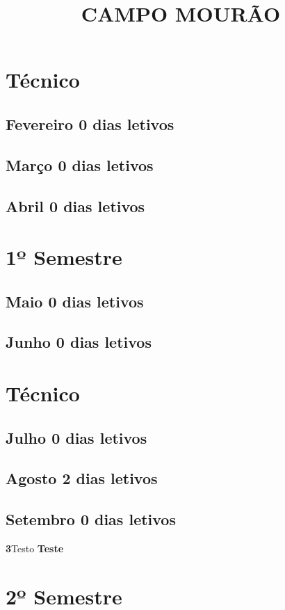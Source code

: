 \documentclass[thesis]{hmcposter}
\author{ }
\title{CAMPO MOURÃO}
\begin{document}
\begin{poster}
			\section{\color{hmcorange}Técnico}\subsection{Fevereiro \hfill 0 dias letivos}\subsection{Março \hfill 0 dias letivos}\subsection{Abril \hfill 0 dias letivos}\vfill\null
\columnbreak
\section{\hfill \color{hmcorange}1º Semestre}
\subsection{Maio \hfill 0 dias letivos}\subsection{Junho \hfill 0 dias letivos}\newpage
\section{\color{hmcorange}Técnico}\subsection{Julho \hfill 0 dias letivos}\subsection{Agosto \hfill 2 dias letivos}\subsection{Setembro \hfill 0 dias letivos}\textbf{3}\quad \quad Testo \textbf{Teste} \newline\vfill\null
\columnbreak
\section{\hfill \color{hmcorange}2º Semestre}

\end{poster}
\end{document}
